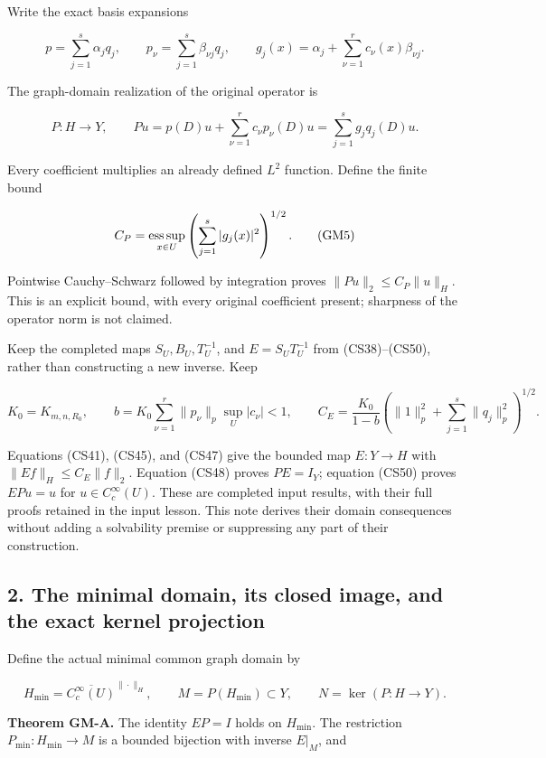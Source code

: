 \documentclass[
  11pt,
]{article}
\begin{document}
Write the exact basis expansions

\[
 p=\sum_{j=1}^s\alpha_jq_j,
 \qquad p_\nu=\sum_{j=1}^s\beta_{\nu j}q_j,
 \qquad
 g_j(x)=\alpha_j+\sum_{\nu=1}^r c_\nu(x)\beta_{\nu j}.
 \tag{GM3}
\]

The graph-domain realization of the original operator is

\[
 P:H\longrightarrow Y,
 \qquad
 Pu=p(D)u+\sum_{\nu=1}^r c_\nu p_\nu(D)u
    =\sum_{j=1}^s g_jq_j(D)u.
 \tag{GM4}
\]

Every coefficient multiplies an already defined
\(L^2\) function. Define the finite bound

\[
 C_P=\mathop{\rm ess\,sup}_{x\in U}
           \left(\sum_{j=1}^s|g_j(x)|^2\right)^{1/2}.
 \tag{GM5}
\]

Pointwise Cauchy--Schwarz followed by integration proves
\(\|Pu\|_2\leq C_P\|u\|_H\). This is an explicit bound, with every
original coefficient present; sharpness of the operator norm is not
claimed.

Keep the completed maps \(S_U,B_U,T_U^{-1}\), and
\(E=S_UT_U^{-1}\) from (CS38)--(CS50), rather than constructing
a new inverse. Keep

\[
 K_0=K_{m,n,R_0},\qquad
 b=K_0\sum_{\nu=1}^r\|p_\nu\|_p\sup_U|c_\nu|<1,
 \qquad
 C_E=\frac{K_0}{1-b}
       \left(\|1\|_p^2+\sum_{j=1}^s\|q_j\|_p^2\right)^{1/2}.
 \tag{GM6}
\]

Equations (CS41), (CS45), and (CS47) give the bounded map
\(E:Y\to H\) with \(\|Ef\|_H\leq C_E\|f\|_2\). Equation
(CS48) proves \(PE=I_Y\); equation (CS50) proves
\(EPu=u\) for \(u\in C_c^\infty(U)\). These are
completed input results, with their full proofs retained in the input
lesson. This note derives their domain consequences without adding a
solvability premise or suppressing any part of their construction.

\subsection{2. The minimal domain, its closed image, and the exact
kernel
projection}\label{the-minimal-domain-its-closed-image-and-the-exact-kernel-projection}

Define the actual minimal common graph domain by

\[
 H_{\min}=\overline{C_c^\infty(U)}^{\|\cdot\|_H},
 \qquad M=P(H_{\min})\subset Y,
 \qquad N=\ker(P:H\to Y).
 \tag{GM7}
\]

\textbf{Theorem GM-A.} The identity \(EP=I\) holds on
\(H_{\min}\). The restriction \(P_{\min}:H_{\min}\to M\)
is a bounded bijection with inverse \(E|_M\), and
\end{document}
